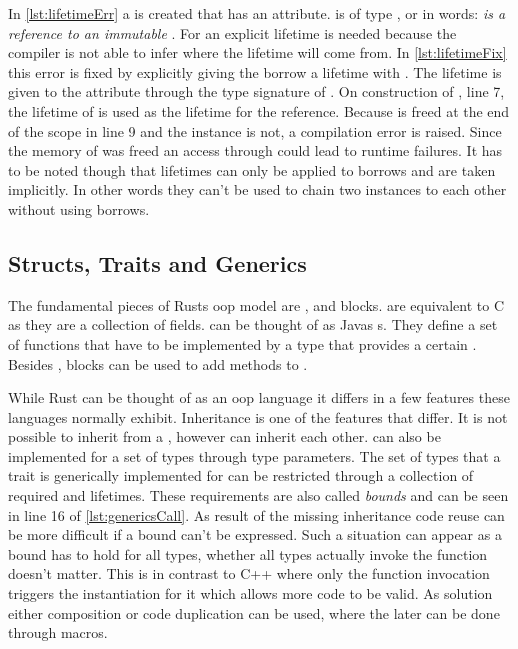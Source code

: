 \documentclass[thesis]{subfiles}
\begin{document}
    In \autoref{lst:lifetimeErr} a \struct \Foo is created that has an attribute.
     is of type , or in words: \emph{ is a reference to an immutable \String}.
    For  an explicit lifetime is needed because the compiler is not able to infer where the lifetime will come from.
    In \autoref{lst:lifetimeFix} this error is fixed by explicitly giving the borrow a lifetime with .
    The lifetime is given to the attribute through the type signature of \Foo.
    On construction of \Foo, line 7, the lifetime of  is used as the lifetime for the reference.
    Because  is freed at the end of the scope in line 9 and the \Foo instance is not, a compilation error is raised.
    Since the memory of  was freed an access through  could lead to runtime failures.
    It has to be noted though that lifetimes can only be applied to borrows and are taken implicitly.
    In other words they can't be used to chain two instances to each other without using borrows\autocite[PhantomData]{rust-doc}.

  \subsection{Structs, Traits and Generics}\label{sec:stg}
    The fundamental pieces of Rusts \gls{oop} model are \structs, \traits and  blocks.
    \structs are equivalent to C \structs as they are a collection of fields.
    \traits can be thought of as Javas s.
    They define a set of functions that have to be implemented by a type that provides a certain \trait.
    Besides \traits,  blocks can be used to add methods to \structs.

    While Rust can be thought of as an \gls{oop} language it differs in a few features these languages normally exhibit.
    Inheritance is one of the features that differ.
    It is not possible to inherit from a \struct, \traits however can inherit each other.
    \traits can also be implemented for a set of types through type parameters.
    The set of types that a trait is generically implemented for can be restricted through a collection of required \traits and lifetimes.
    These requirements are also called \emph{bounds} and can be seen in line 16 of \autoref{lst:genericsCall}.
    As result of the missing inheritance code reuse can be more difficult if a bound can't be expressed.
    Such a situation can appear as a bound has to hold for all types, whether all types actually invoke the function doesn't matter.
    This is in contrast to C++ where only the function invocation triggers the instantiation for it\autocite[§17.8.1 10]{cpp-iso} which allows more code to be valid.
    As solution either composition or code duplication can be used, where the later can be done through macros.
    \autocite[10. Generic Types, Traits, and Lifetimes, 17. Object Oriented Programming Features of Rust]{rust-book}
\end{document}
